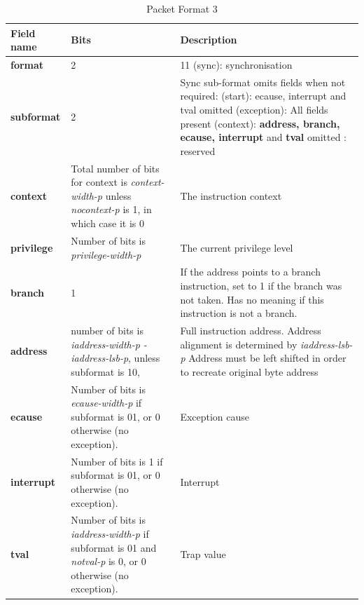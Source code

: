 \begin{table}[htp]
    \centering
    \caption{Packet Format 3}
    \label{tab:te_inst3}
    \begin{tabulary}{\textwidth}{|l|p{35mm}|p{80mm}|}
      \hline
          {\bf Field name} & {\bf Bits} & {\bf Description} \\
          \hline
          \textbf{format} & 2 & 11 (sync): synchronisation\\
          \hline
          \textbf{subformat} & 2 & Sync sub-format omits fields when not required:  (start): ecause, interrupt and tval omitted  (exception): All fields present (context): \textbf{address, branch, ecause, interrupt} and \textbf {tval} omitted  : reserved \\
          \hline
          \textbf{context} &  Total number of bits 
                     for context is  
                     \textit {context-width-p} 
                     unless  
                     \textit {nocontext-p} is 1,  
                     in which case it is 0 & 
                     The instruction context \\
          \hline
          \textbf{privilege} & Number of bits is  
                      \textit {privilege-width-p} & 
                      The current privilege level \\
          \hline
          \textbf{branch} & 1 & If the address points to a branch instruction, set to 1 if the branch was not taken. 
          Has no meaning if this instruction is not a branch. \\
          \hline
          \textbf{address} & number of bits is  
                    \textit {iaddress-width-p - iaddress-lsb-p},  
                    unless subformat is 10, & 
                    Full instruction address.  Address alignment is determined by \textit {iaddress-lsb-p} Address must be left shifted in order to recreate original byte address \\
          \hline
          \textbf{ecause} & Number of bits is  
                   \textit {ecause-width-p} if  
                   subformat is 01,  
                   or 0 otherwise  
                   (no exception). & 
                   Exception cause \\
          \hline
          \textbf{interrupt} & Number of bits is  
                      1 if subformat is 01,  
                      or 0 otherwise (no exception). & 
                      Interrupt \\
          \hline
          \textbf{tval} & Number of bits is  
                 \textit {iaddress-width-p}  
                 if subformat is  
                 01 and \textit {notval-p} is 
                 0, or 0 otherwise  
                 (no exception). & 
                 Trap value \\
          \hline
    \end{tabulary}
\end{table}

